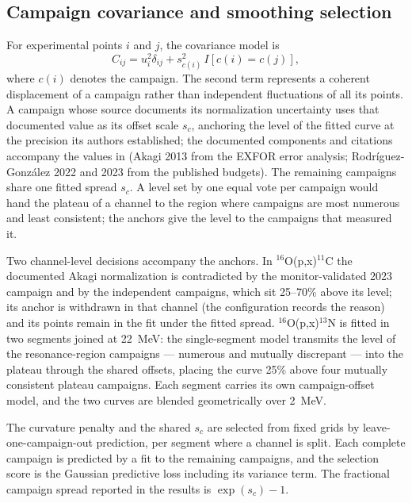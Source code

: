 \documentclass[11pt]{article}
\begin{document}
\subsection{Campaign covariance and smoothing selection}

For experimental points $i$ and $j$, the covariance model is
\begin{equation}
  C_{ij}=u_i^2\delta_{ij}+s_{c(i)}^2\, I[c(i)=c(j)],
  \label{eq:covariance}
\end{equation}
where $c(i)$ denotes the campaign.  The second term represents a coherent
displacement of a campaign rather than independent fluctuations of all its
points.  A campaign whose source documents its normalization uncertainty
uses that documented value as its offset scale $s_c$, anchoring the level of
the fitted curve at the precision its authors established; the documented
components and citations accompany the values in
 (Akagi 2013 from the EXFOR error analysis;
Rodr\'iguez-Gonz\'alez 2022 and 2023 from the published budgets).  The
remaining campaigns share one fitted spread $s_c$.  A level set by one equal
vote per campaign would hand the plateau of a channel to the region where
campaigns are most numerous and least consistent; the anchors give the level
to the campaigns that measured it.

Two channel-level decisions accompany the anchors.  In
$^{16}$O(p,x)$^{11}$C the documented Akagi normalization is contradicted by
the monitor-validated 2023 campaign and by the independent campaigns, which
sit 25--70\% above its level; its anchor is withdrawn in that channel (the
configuration records the reason) and its points remain in the fit under the
fitted spread.  $^{16}$O(p,x)$^{13}$N is fitted in two segments joined at
\SI{22}{MeV}: the single-segment model transmits the level of the
resonance-region campaigns --- numerous and mutually discrepant --- into the
plateau through the shared offsets, placing the curve 25\% above four
mutually consistent plateau campaigns.  Each segment carries its own
campaign-offset model, and the two curves are blended geometrically over
\SI{2}{MeV}.

The curvature penalty and the shared $s_c$ are selected from fixed grids by
leave-one-campaign-out prediction, per segment where a channel is split.  Each complete campaign is predicted by a
fit to the remaining campaigns, and the selection score is the Gaussian
predictive loss including its variance term.  The fractional campaign spread
reported in the results is $\exp(s_c)-1$.
\end{document}
